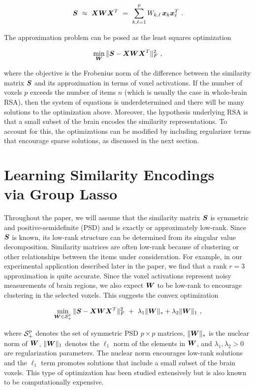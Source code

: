 $$\bS \ \approx \ \bX\bW\bX^T \ = \ \sum_{k,\ell=1}^p W_{k,\ell} \, \bx_k \bx_{\ell}^T \ .$$

The approximation problem can be posed as the least squares optimization

$$\min_{\bW} \|\bS-\bX\bW\bX^T\|_F^2 \ , $$

where the objective is the Frobenius norm of the difference between the similarity matrix
$\boldsymbol{S}$ and its approximation in terms of voxel activations. If the number of voxels $p$
exceeds the number of items $n$ (which is usually the case in whole-brain RSA), then the
system of equations is underdetermined and there will be many solutions to the
optimization above. Moreover, the hypothesis underlying RSA is that a small subset of the
brain encodes the similarity representations. To account for this, the optimizations can
be modified by including regularizer terms that encourage sparse solutions, as discussed
in the next section.

\section{Learning Similarity Encodings \\ via Group Lasso}


Throughout the paper, we will assume that the similarity matrix $\boldsymbol{S}$ is symmetric and
positive-semidefinite (PSD) and is exactly or approximately low-rank. Since $\boldsymbol{S}$ is
known, its low-rank structure can be determined from its singular value decomposition.
Similarity matrices are often low-rank because of clustering or other relationships
between the items under consideration. For example, in our experimental application
described later in the paper, we find that a rank $r=3$ approximation is quite accurate.
Since the voxel activations represent noisy measurements of brain regions, we also expect
$\boldsymbol{W}$ to be low-rank to encourage clustering in the selected voxels. This suggests the
convex optimization

$$\min_{\bW\in \S_+^p} \|\bS-\bX\bW\bX^T\|_F^2 \ + \ \lambda_1 \|\bW\|_\ast + \lambda_2 \|\bW\|_1 \ , $$

where $\S_+^p$ denotes the set of symmetric PSD $p\times p$ matrices, $ \|\boldsymbol{W}\|_\ast$ is
the nuclear norm of $\boldsymbol{W}$, $\|\boldsymbol{W}\|_1 $ denotes the $\ell_1$ norm of the elements in
$\boldsymbol{W}$, and $\lambda_1,\lambda_2>0$ are regularization parameters. The nuclear norm
encourages low-rank solutions and the $\ell_1$ term promotes solutions that include a
small subset of the brain voxels.  This type of optimization has been studied extensively
\cite{maryam} but is also known to be computationally expensive.

